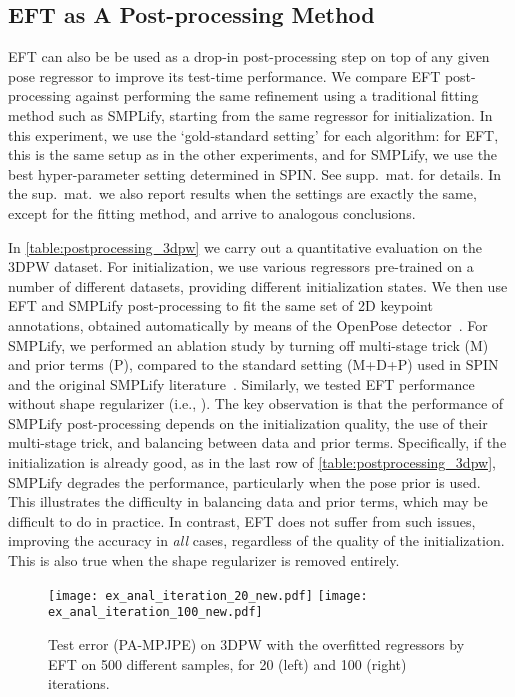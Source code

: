 \documentclass[10pt,twocolumn,letterpaper]{article}
\begin{document}
\subsection{EFT as A Post-processing Method}\label{s:eft-post}
	EFT can also be be used as a drop-in post-processing step on top of any given pose regressor  to improve its test-time performance.
	We compare EFT post-processing against performing the same refinement using a traditional fitting method such as SMPLify, starting from the same regressor for initialization.
In this experiment, we use the `gold-standard setting' for each algorithm: for EFT, this is the same setup as in the other experiments, and for SMPLify, we use the best hyper-parameter setting determined in SPIN\@. See supp.~mat. for details.
In the sup.~mat.~we also report results when the settings are exactly the same, except for the fitting method, and arrive to analogous conclusions.
	
In \cref{table:postprocessing_3dpw} we carry out a quantitative evaluation on the 3DPW dataset.
	For initialization, we use various regressors  pre-trained on a number of different datasets, providing different initialization states.
	We then use EFT and SMPLify post-processing to fit the same set of 2D keypoint annotations, obtained automatically by means of the OpenPose detector~\cite{cao2018openpose}.
For SMPLify, we performed an ablation study by turning off multi-stage trick (M) and prior terms (P), compared to the standard setting (M+D+P) used in SPIN and the original SMPLify literature~\cite{Bogo2016}.
	Similarly, we tested EFT performance without shape regularizer (i.e., ).
The key observation is that the performance of SMPLify post-processing depends on the initialization quality, the use of their multi-stage trick, and balancing between data and prior terms.
	Specifically, if the initialization is already good, as in the last row of \cref{table:postprocessing_3dpw}, SMPLify degrades the performance, particularly when the pose prior is used.
	This illustrates the difficulty in balancing data and prior terms, which may be difficult to do in practice. In contrast, EFT does not suffer from such issues, improving the accuracy in \emph{all} cases, regardless of the quality of the initialization.
	This is also true when the shape regularizer is removed entirely.
	
	\begin{figure}
		\texttt{[image: ex\_anal\_iteration\_20\_new.pdf]}
		\texttt{[image: ex\_anal\_iteration\_100\_new.pdf]}\caption{Test error (PA-MPJPE) on 3DPW with the overfitted regressors by EFT on 500 different samples, for 20 (left) and 100 (right) iterations.}\label{fig:Exemplar_analysis_1}
	\end{figure}
\end{document}
